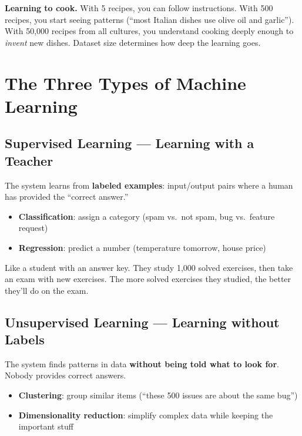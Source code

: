 \documentclass[11pt,a4paper]{report}
\begin{document}
\begin{analogybox}
\textbf{Learning to cook.} With 5 recipes, you can follow instructions. With 500 recipes, you start seeing patterns (``most Italian dishes use olive oil and garlic''). With 50,000 recipes from all cultures, you understand cooking deeply enough to \textit{invent} new dishes. Dataset size determines how deep the learning goes.
\end{analogybox}

\section{The Three Types of Machine Learning}

\subsection{Supervised Learning --- Learning with a Teacher}

The system learns from \textbf{labeled examples}: input/output pairs where a human has provided the ``correct answer.''

\begin{itemize}
    \item \textbf{Classification}: assign a category (spam vs.\ not spam, bug vs.\ feature request)
    \item \textbf{Regression}: predict a number (temperature tomorrow, house price)
\end{itemize}

\begin{analogybox}
Like a student with an answer key. They study 1,000 solved exercises, then take an exam with new exercises. The more solved exercises they studied, the better they'll do on the exam.
\end{analogybox}

\subsection{Unsupervised Learning --- Learning without Labels}

The system finds patterns in data \textbf{without being told what to look for}. Nobody provides correct answers.

\begin{itemize}
    \item \textbf{Clustering}: group similar items (``these 500 issues are about the same bug'')
    \item \textbf{Dimensionality reduction}: simplify complex data while keeping the important stuff
\end{itemize}
\end{document}
